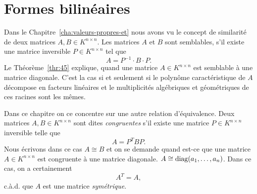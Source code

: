\chapter{Formes bilinéaires}
\label{cha:prod-scal-et}


\noindent 
Dans le Chapitre~\ref{cha:valeurs-propres-et} nous avons vu le concept de similarité de deux matrices $A , B ∈K ^{n ×n}$. Les matrices $A$ et $B$ sont semblables, s'il existe une matrice  inversible $P ∈K^{n ×n}$ tel que
\begin{displaymath}
  A = P^{-1} ⋅B ⋅P. 
\end{displaymath}
Le Théorème~\ref{thr:45} explique, quand une matrice $A ∈ K^{n ×n}$ est semblable à une matrice diagonale. C'est la cas si et seulement si le polynôme caractéristique de $A$ décompose en facteurs linéaires et le multiplicités algébriques et géométriques   de ces racines sont les mêmes.

Dans ce chapitre on ce concentre sur une autre relation d'équivalence.  Deux matrices $A,B \in K^{n\times n}$ sont dites \emph{congruentes} s'il existe une matrice $P \in K^{n \times n}$ inversible telle que 
\begin{displaymath}
  A = P^T B P.
\end{displaymath}
Nous écrivons dans ce cas $A \cong B$ et on se demande quand est-ce que une matrice $A ∈ K^{n ×n}$ est congruente à une matrice diagonale. $A \cong \operatorname{diag}(a_1,\dots,a_n)$. Dans ce cas, on a certainement
\begin{displaymath}
  A^T = A, 
\end{displaymath}
c.à.d. que $A$ est une matrice \emph{symétrique}.

